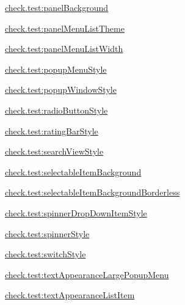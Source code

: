 {\ttfamily \hyperlink{classcheck_1_1test_1_1_r_1_1styleable_a07ce7800e0d7dc1fce4e70ecde15e5a5}{check.\+test\+:panel\+Background}}

{\ttfamily \hyperlink{classcheck_1_1test_1_1_r_1_1styleable_a1d6dd9a183e0165672173da100f35f74}{check.\+test\+:panel\+Menu\+List\+Theme}}

{\ttfamily \hyperlink{classcheck_1_1test_1_1_r_1_1styleable_ac3385a441e77f588205019797ec7c36f}{check.\+test\+:panel\+Menu\+List\+Width}}

{\ttfamily \hyperlink{classcheck_1_1test_1_1_r_1_1styleable_a84e7e01578f21a4c36f013d3e5d3b917}{check.\+test\+:popup\+Menu\+Style}}

{\ttfamily \hyperlink{classcheck_1_1test_1_1_r_1_1styleable_a84838496bac2e683af2e800bfafd3f41}{check.\+test\+:popup\+Window\+Style}}

{\ttfamily \hyperlink{classcheck_1_1test_1_1_r_1_1styleable_a28affc2ca7d484ddc9e704772938a600}{check.\+test\+:radio\+Button\+Style}}

{\ttfamily \hyperlink{classcheck_1_1test_1_1_r_1_1styleable_ac5ebe24516424df00451d25bb71bf29c}{check.\+test\+:rating\+Bar\+Style}}

{\ttfamily \hyperlink{classcheck_1_1test_1_1_r_1_1styleable_adf1afa34cedcf221081b21bda1f70e5c}{check.\+test\+:search\+View\+Style}}

{\ttfamily \hyperlink{classcheck_1_1test_1_1_r_1_1styleable_a0316097f83d9af63e8806ec4839f94a9}{check.\+test\+:selectable\+Item\+Background}}

{\ttfamily \hyperlink{classcheck_1_1test_1_1_r_1_1styleable_ab577cbb82ea3ae0fddb617a7cbc27530}{check.\+test\+:selectable\+Item\+Background\+Borderless}}

{\ttfamily \hyperlink{classcheck_1_1test_1_1_r_1_1styleable_ac74684f630293fb28782a9ce322bad2c}{check.\+test\+:spinner\+Drop\+Down\+Item\+Style}}

{\ttfamily \hyperlink{classcheck_1_1test_1_1_r_1_1styleable_aee62b48940c1b2da28bf4a38059b29ff}{check.\+test\+:spinner\+Style}}

{\ttfamily \hyperlink{classcheck_1_1test_1_1_r_1_1styleable_a2816120337bd94eb4728d7a72ace5ce4}{check.\+test\+:switch\+Style}}

{\ttfamily \hyperlink{classcheck_1_1test_1_1_r_1_1styleable_a3c2ff2e7da8190569961b889ced77fcd}{check.\+test\+:text\+Appearance\+Large\+Popup\+Menu}}

{\ttfamily \hyperlink{classcheck_1_1test_1_1_r_1_1styleable_a1a1b8a87f2acabee24a7e564989bfbe3}{check.\+test\+:text\+Appearance\+List\+Item}}

